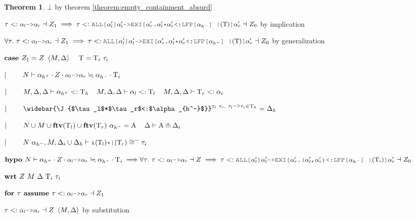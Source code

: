 \documentclass[acmsmall]{acmart}
\theoremstyle{definition}
\newtheorem{theorem}{Theorem}[section]
\begin{document}
\begin{theorem}
        \item \Z\Z\Z\Z $\bot$ by theorem \ref{theorem:empty_containment_absurd}
      \item \Z\Z\Z $
        \tau \subtypes \J{$\alpha_l$->$\alpha_r$} \given Z_1
        \implies
        \tau
        \subtypes
        \J{ALL[$\alpha_l'$]$\alpha_l'$->EXI[$\alpha_r'$.$\alpha_l'$*$\alpha_r'$<:LFP[$\alpha_{h^-}$] |$(\Tau)$]$\alpha_r'$} 
        \given Z_0
      $ by implication
    \item \Z\Z $
      \forall \tau .\ 
      \tau \subtypes \J{$\alpha_l$->$\alpha_r$} \given Z_1
      \implies
      \tau
      \subtypes
      \J{ALL[$\alpha_l'$]$\alpha_l'$->EXI[$\alpha_r'$.$\alpha_l'$*$\alpha_r'$<:LFP[$\alpha_{h^-}$] |$(\Tau)$]$\alpha_r'$} 
      \given Z_0
    $ by generalization 
  \item \Z $\B{case }
    Z_1 = Z\ \left<M, \Delta \right> \I \Tau = \Tau_i\ \tau_i
  $
  \item \Z $\contin
    N \entails 
    \alpha_{h^+} \cdot Z \cdot \J{$\alpha_l$->$\alpha_r$} 
    \fallingdotseq 
    \alpha_{h^-} \cdot \Tau_i
  $
  \item \Z $|\ \ \ \ \ \ \ 
    M, \Delta, \Delta \vdash \alpha_{h^+} <: \mathrm{T}_h
    \hspace{4mm}
    M, \Delta, \Delta \vdash \alpha_l <: \mathrm{T}_l 
    \hspace{4mm}
    M, \Delta, \Delta \vdash \mathrm{T}_r <: \alpha_r
  $
  \item \Z $\contin
    \widebar{\J{$\tau_l$*$\tau_r$<:$\alpha_{h^-}$}}^{\tau_l\ \tau_r .\ \tau_l\J{->}\tau_r \in \Tau_h} = \Delta_h
  $
  \item \Z $\contin
    N \cup M \cup \textbf{ftv}(\Tau_l) \cup \textbf{ftv}(\Tau_r)\ \alpha_{h^-} = \Alpha 
    \I
    \Delta \entails \Alpha \pitchfork \Delta_i  
  $
  \item \Z $\contin
    N\ \alpha_{h^-}, M, \Delta_i \cup \Delta_h \entails \J{\&$(\Tau_l)$*|$(\Tau_r)$} \cong^{-} \tau_i
  $
  \item \Z $\B{hypo }
    N \entails 
    \alpha_{h^+} \cdot Z \cdot \J{$\alpha_l$->$\alpha_r$} 
    \fallingdotseq 
    \alpha_{h^-} \cdot \Tau_i
    \implies
    \\
    \forall \tau .\ 
    \tau \subtypes \J{$\alpha_l$->$\alpha_r$} \given Z
    \implies
    \tau
    \subtypes
    \J{ALL[$\alpha_l'$]$\alpha_l'$->EXI[$\alpha_r'$.($\alpha_l'$,$\alpha_r'$)<:LFP[$\alpha_{h^-}$] |$(\Tau_i)$]$\alpha_r'$} 
    \given Z_0
  $
  \item \Z $\textbf{wrt }
    Z\ M\ \Delta\ \mathrm{T}_i\ \tau_i
  $

    \item \Z\Z $\B{for } \tau \B{ assume }
      \tau \subtypes \J{$\alpha_l$->$\alpha_r$} \given Z_1
    $
      \item \Z\Z\Z $
        \tau \subtypes \J{$\alpha_l$->$\alpha_r$} \given Z\ \left<M, \Delta\right>
      $ by substitution


\end{theorem}
\end{document}
